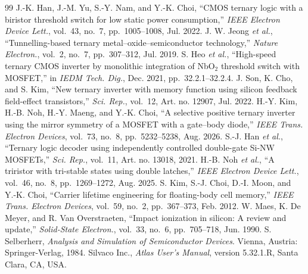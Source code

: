 \documentclass[journal]{IEEEtran}
\begin{document}
\begin{thebibliography}{99}
 J.-K. Han, J.-M. Yu, S.-Y. Nam, and Y.-K. Choi, ``CMOS ternary logic with a biristor threshold switch for low static power consumption,'' \emph{IEEE Electron Device Lett.}, vol.~43, no.~7, pp.~1005--1008, Jul. 2022.
 J. W. Jeong \emph{et al.}, ``Tunnelling-based ternary metal--oxide--semiconductor technology,'' \emph{Nature Electron.}, vol.~2, no.~7, pp.~307--312, Jul. 2019.
 S. Heo \emph{et al.}, ``High-speed ternary CMOS inverter by monolithic integration of NbO$_2$ threshold switch with MOSFET,'' in \emph{IEDM Tech. Dig.}, Dec. 2021, pp.~32.2.1--32.2.4.
 J. Son, K. Cho, and S. Kim, ``New ternary inverter with memory function using silicon feedback field-effect transistors,'' \emph{Sci. Rep.}, vol.~12, Art. no. 12907, Jul. 2022.
 H.-Y. Kim, H.-B. Noh, H.-Y. Maeng, and Y.-K. Choi, ``A selective positive ternary inverter using the mirror symmetry of a MOSFET with a gate--body diode,'' \emph{IEEE Trans. Electron Devices}, vol.~73, no.~8, pp.~5232--5238, Aug. 2026.
 S.-J. Han \emph{et al.}, ``Ternary logic decoder using independently controlled double-gate Si-NW MOSFETs,'' \emph{Sci. Rep.}, vol.~11, Art. no. 13018, 2021.
 H.-B. Noh \emph{et al.}, ``A triristor with tri-stable states using double latches,'' \emph{IEEE Electron Device Lett.}, vol.~46, no.~8, pp.~1269--1272, Aug. 2025.
 S. Kim, S.-J. Choi, D.-I. Moon, and Y.-K. Choi, ``Carrier lifetime engineering for floating-body cell memory,'' \emph{IEEE Trans. Electron Devices}, vol.~59, no.~2, pp.~367--373, Feb. 2012.
 W. Maes, K. De Meyer, and R. Van Overstraeten, ``Impact ionization in silicon: A review and update,'' \emph{Solid-State Electron.}, vol.~33, no.~6, pp.~705--718, Jun. 1990.
 S. Selberherr, \emph{Analysis and Simulation of Semiconductor Devices}. Vienna, Austria: Springer-Verlag, 1984.
 Silvaco Inc., \emph{Atlas User's Manual}, version 5.32.1.R, Santa Clara, CA, USA.
\end{thebibliography}
\end{document}
